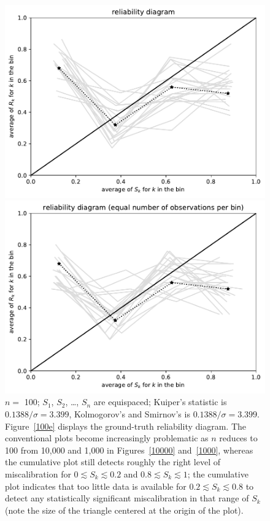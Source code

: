 \documentclass{article}
\begin{document}
\begin{figure}
\begin{centering}
\parbox{\imsize}{\includegraphics[width=\imsize]
                {./codes/unweighted/100_4_0_0/equiprob.pdf}}
\quad\quad
\parbox{\imsize}{\includegraphics[width=\imsize]
                {./codes/unweighted/100_4_0_0/equisamp.pdf}}

\end{centering}
\caption{$n =$ 100; $S_1$, $S_2$, \dots, $S_n$ are equispaced;
         Kuiper's statistic is $0.1388 / \sigma = 3.399$,
         Kolmogorov's and Smirnov's is $0.1388 / \sigma = 3.399$.
Figure~\ref{100e} displays the ground-truth reliability diagram.
The conventional plots become increasingly problematic as $n$ reduces to 100
from 10,000 and 1,000 in Figures~\ref{10000} and~\ref{1000},
whereas the cumulative plot still detects roughly the right level
of miscalibration for $0 \lesssim S_k \lesssim 0.2$
and $0.8 \lesssim S_k \lesssim 1$; the cumulative plot
indicates that too little data is available for $0.2 \lesssim S_k \lesssim 0.8$
to detect any statistically significant miscalibration in that range of $S_k$
(note the size of the triangle centered at the origin of the plot).
}
\label{100}
\end{figure}
\end{document}
